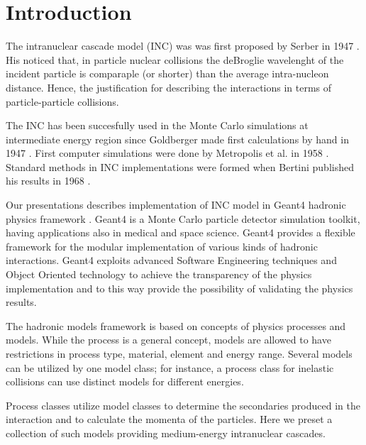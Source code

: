 \section{Introduction}

The intranuclear cascade model (INC) was was first proposed by Serber in 1947 \cite{serber47}.  
His noticed that, in particle nuclear collisions the deBroglie wavelenght of the incident particle is 
comparaple (or shorter) than the average intra-nucleon distance.
Hence, the justification for describing the interactions in terms of particle-particle  collisions.


The INC has been succesfully used in the Monte Carlo simulations at intermediate energy region 
since Goldberger made first calculations by hand in 1947 \cite{goldberger48}. 
First computer simulations were done by Metropolis et al. in 1958 \cite{metropolis58}. 
Standard methods in INC implementations were formed when Bertini published his results in 1968 \cite{bertini68}.



Our presentations describes implementation of INC model in {\sc Geant4} hadronic physics framework \cite{geant4collaboration03}.
Geant4 is a Monte Carlo particle detector simulation toolkit, having applications also in  medical and space
science. 
Geant4 provides a flexible framework for the modular implementation of
various kinds of hadronic interactions. 
Geant4 exploits advanced Software Engineering techniques and Object
Oriented technology to achieve the transparency of the physics
implementation and to this way provide the possibility of validating the
physics results. 

The hadronic models framework is based on concepts of physics
processes and models. While the process is a general concept, models
are allowed to have restrictions in process type, material, element
and energy range.  Several models can be utilized by one model class; for instance, a
process class for inelastic collisions can use distinct models for different energies.


Process classes utilize model classes to determine the
secondaries produced in the interaction and to calculate the momenta
of the particles. Here we preset a collection of such models providing medium-energy
intranuclear cascades.






